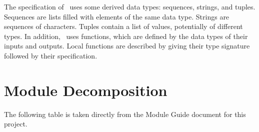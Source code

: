 \documentclass[12pt, titlepage]{article}
\begin{document}
\noindent
The specification of \progname \ uses some derived data types: sequences, strings, and
tuples. Sequences are lists filled with elements of the same data type. Strings are sequences of characters. Tuples contain a list of values, potentially of
different types. In addition, \progname \ uses functions, which
are defined by the data types of their inputs and outputs. Local functions are
described by giving their type signature followed by their specification.

\section{Module Decomposition}

The following table is taken directly from the Module Guide document for this project.
\end{document}
